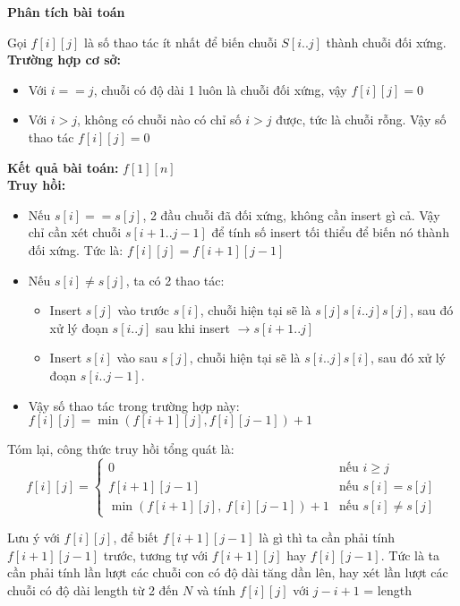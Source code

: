 \textbf{Phân tích bài toán}

Gọi $f[i][j]$ là số thao tác ít nhất để biến chuỗi $S[i..j]$ thành chuỗi đối xứng.\\

\textbf{Trường hợp cơ sở:}
\begin{itemize}
    \item Với $i == j$, chuỗi có độ dài 1 luôn là chuỗi đối xứng, vậy $f[i][j] = 0$
    \item Với $i > j$, không có chuỗi nào có chỉ số $i > j$ được, tức là chuỗi rỗng. Vậy số thao tác $f[i][j] = 0$
\end{itemize}

\textbf{Kết quả bài toán:} $f[1][n]$ \\

\textbf{Truy hồi:}
\begin{itemize}
    \item Nếu $s[i] == s[j]$, 2 đầu chuỗi đã đối xứng, không cần insert gì cả. Vậy chỉ cần xét chuỗi $s[i + 1 .. j - 1]$ để tính số insert tối thiểu để biến nó thành đối xứng. Tức là: $f[i][j] = f[i + 1][j - 1]$
    \item Nếu $s[i] \neq s[j]$, ta có 2 thao tác:
    \begin{itemize}
        \item Insert $s[j]$ vào trước $s[i]$, chuỗi hiện tại sẽ là $s[j]s[i..j]s[j]$, sau đó xử lý đoạn $s[i..j]$ sau khi insert $\rightarrow s[i + 1..j]$
        \item Insert $s[i]$ vào sau $s[j]$, chuỗi hiện tại sẽ là $s[i..j]s[i]$, sau đó xử lý đoạn $s[i..j-1]$.
    \end{itemize}
    \item Vậy số thao tác trong trường hợp này: $f[i][j] = \min(f[i + 1][j], f[i][j - 1]) + 1$
\end{itemize}

Tóm lại, công thức truy hồi tổng quát là:
\[
f[i][j] =
\begin{cases}
0 & \text{nếu } i \geq j \\
f[i+1][j-1] & \text{nếu } s[i] = s[j] \\
\min \left( f[i+1][j],\ f[i][j-1] \right) + 1 & \text{nếu } s[i] \neq s[j]
\end{cases}
\]

Lưu ý với $f[i][j]$, để biết $f[i + 1][j - 1]$ là gì thì ta cần phải tính $f[i + 1][j - 1]$ trước, tương tự với $f[i + 1][j]$ hay $f[i][j - 1]$. Tức là ta cần phải tính lần lượt các chuỗi con có độ dài tăng dần lên, hay xét lần lượt các chuỗi có độ dài length từ 2 đến $N$ và tính $f[i][j]$ với $j - i + 1$ = length \\

